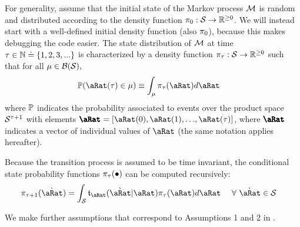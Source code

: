 \documentclass[\econtexRoot/BufferStockTheory.tex]{subfiles}
\begin{document}
For generality, \cite{saDiscrete,saQuantitative} assume that  the initial state of the Markov process $\mathcal{M}$ is random and distributed according to the density function $\pi_{0} : \mathcal{S} \rightarrow \mathbb{R}^{\geq 0}$.  We will instead start with a well-defined initial density function (also $\pi_{0}$), because this makes debugging the code easier.  The state distribution of $\mathcal{M}$ at time $\tau \in \mathbb{N} \doteq  \{1,2,3,...\}$ is characterized by a density function $\pi_{\tau} : \mathcal{S} \rightarrow \mathbb{R}^{\geq 0}$ such that for all $\mu \in \mathcal{B}({\mathcal{S}}),$
\begin{equation}\begin{gathered}\begin{aligned}
  \PrbEvntSqnc(\pnt(\tAbs) \in \SetPartCnts) & \equiv \int_{\SetPartCnts} \DnsPnt_{\tAbs}(\pnt)d\pnt
\end{aligned}\end{gathered}\end{equation}
where $\mathbb{P}$ indicates the probability associated to events over the product space $\mathcal{S}^{\tau+1}$ with elements $\vctr{\pnt}=[\pnt(0),\pnt(1),{\dots},\pnt(\tAbs)]$, where $\vctr{\pnt}$ indicates a vector of individual values of $\pnt$ (the same notation applies hereafter).

Because the transition process is assumed to be time invariant, the conditional state probability functions $\pi_{\tau}(\bullet)$ can be computed recursively:
\begin{equation}\begin{gathered}\begin{aligned}
  \DnsPnt_{\tAbs+1}(\Nxt{\pnt}) &= \int_{\SetFullCnts} \DnsPntNxtFmPntNow_{\pnt}(\Nxt{\pnt}|\pnt)\DnsPnt_{\tAbs}(\pnt)d\pnt ~~~~ \forall~\Nxt{\pnt} \in \SetFullCnts \label{eq:stateDensity}
\end{aligned}\end{gathered}\end{equation}

We make further assumptions that correspond to Assumptions 1 and 2 in \cite{saDiscrete}.

\end{document}

